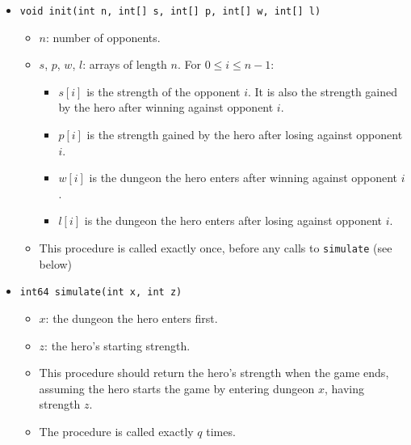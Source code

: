 \begin{itemize}
\item \texttt{void init(int n, int[] s, int[] p, int[] w, int[] l)}
\begin{itemize}
\item $n$: number of opponents.
\item $s$, $p$, $w$, $l$: arrays of length $n$. For $0 \leq i \leq n-1$:
  \begin{itemize}
  \item $s[i]$ is the strength of the opponent $i$. It is also the strength gained by the hero after
winning against opponent $i$.
  \item $p[i]$ is the strength gained by the hero after losing against opponent  $i$.
  \item $w[i]$ is the dungeon the hero enters after winning against opponent $i$.
  \item $l[i]$ is the dungeon the hero enters after losing against opponent $i$.
\end{itemize}
\item This procedure is called exactly once, before any calls to \texttt{simulate} (see below)
\end{itemize}
\item \texttt{int64 simulate(int x, int z)}
\begin{itemize}
\item $x$: the dungeon the hero enters first.
\item $z$: the hero's starting strength.
\item This procedure should return the hero's strength when the game ends, assuming the hero starts
the game by entering dungeon $x$, having strength $z$.
\item The procedure is called exactly $q$ times.
\end{itemize}
\end{itemize}